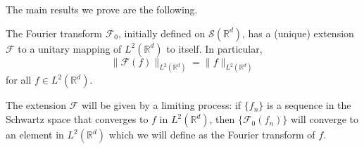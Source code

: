 The main results we prove are the following.

\begin{theorem}
  The Fourier transform $\mathcal F_0$, initially defined on $\mathcal S(\mathbb R^d)$,
  has a (unique) extension $\mathcal F$ to a unitary mapping of $L^2(\mathbb R^d)$ to itself.
  In particular,
  \[
  \|\mathcal F(f)\|_{L^2(\mathbb R^d)} = \|f\|_{L^2(\mathbb R^d)}
  \]
  for all $f\in L^2(\mathbb R^d)$.
\end{theorem}

The extension $\mathcal F$ will be given by a limiting process: if $\{f_n\}$ is a sequence in the Schwartz space that converges to $f$ in $L^2(\mathbb R^d)$, 
then $\{\mathcal F_0(f_n)\}$ will converge to an element in $L^2(\mathbb R^d)$ which we will define as the Fourier transform of $f$.